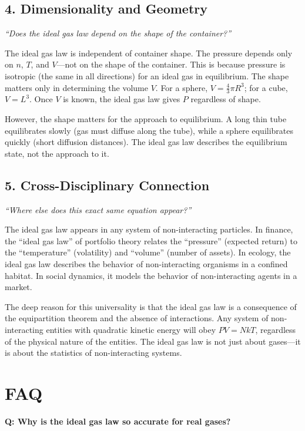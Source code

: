\subsection*{4. Dimensionality and Geometry}
\textit{``Does the ideal gas law depend on the shape of the container?''}

The ideal gas law is independent of container shape. The pressure depends only on $n$, $T$, and $V$---not on the shape of the container. This is because pressure is isotropic (the same in all directions) for an ideal gas in equilibrium. The shape matters only in determining the volume $V$. For a sphere, $V = \frac{4}{3}\pi R^3$; for a cube, $V = L^3$. Once $V$ is known, the ideal gas law gives $P$ regardless of shape.

However, the shape matters for the approach to equilibrium. A long thin tube equilibrates slowly (gas must diffuse along the tube), while a sphere equilibrates quickly (short diffusion distances). The ideal gas law describes the equilibrium state, not the approach to it.

\subsection*{5. Cross-Disciplinary Connection}
\textit{``Where else does this exact same equation appear?''}

The ideal gas law appears in any system of non-interacting particles. In finance, the ``ideal gas law'' of portfolio theory relates the ``pressure'' (expected return) to the ``temperature'' (volatility) and ``volume'' (number of assets). In ecology, the ideal gas law describes the behavior of non-interacting organisms in a confined habitat. In social dynamics, it models the behavior of non-interacting agents in a market.

The deep reason for this universality is that the ideal gas law is a consequence of the equipartition theorem and the absence of interactions. Any system of non-interacting entities with quadratic kinetic energy will obey $PV = NkT$, regardless of the physical nature of the entities. The ideal gas law is not just about gases---it is about the statistics of non-interacting systems.

\section*{FAQ}

\textbf{Q: Why is the ideal gas law so accurate for real gases?}

